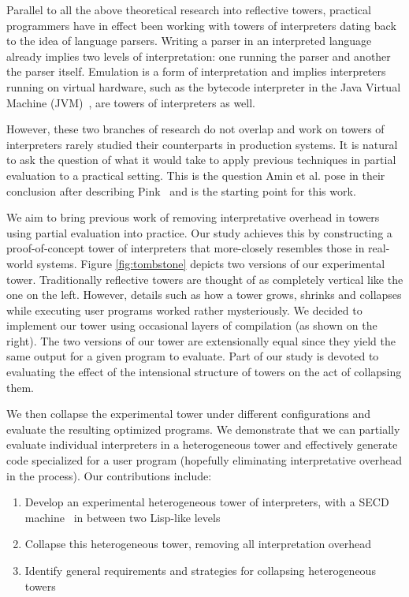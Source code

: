 \documentclass[sigplan,anonymous,review]{acmart}
\theoremstyle{definition}
\begin{document}
Parallel to all the above theoretical research into reflective towers, practical programmers have in effect been working with towers of interpreters dating back to the idea of language parsers. Writing a parser in an interpreted language already implies two levels of interpretation:
one running the parser and another the parser itself. Emulation is a form of interpretation and implies interpreters running on virtual hardware, such as the bytecode interpreter in the Java Virtual Machine (JVM)~\cite{lindholm2014java}, are towers of interpreters as well.

However, these two branches of research do not overlap and work on towers of interpreters rarely studied their counterparts in production systems. It is natural to ask the question of what it would take to apply previous techniques in partial evaluation to a practical setting. This is the question Amin et al. pose in their conclusion after describing Pink~\cite{amin2017collapsing} and is the starting point for this work.

We aim to bring previous work of removing interpretative overhead in towers using partial evaluation into practice. Our study achieves this by constructing a proof-of-concept tower of interpreters that more-closely resembles those in real-world systems. Figure \ref{fig:tombstone} depicts two versions of our experimental tower. Traditionally reflective towers are thought of as completely vertical like the one on the left. However, details such as how a tower grows, shrinks and collapses while executing user programs worked rather mysteriously. We decided to implement our tower using occasional layers of compilation (as shown on the right). The two versions of our tower are extensionally equal since they yield the same output for a given program to evaluate. Part of our study is devoted to evaluating the effect of the intensional structure of towers on the act of collapsing them.

We then collapse the experimental tower under different configurations and evaluate the resulting optimized programs. We demonstrate that we can partially evaluate individual interpreters in a heterogeneous tower and effectively generate code specialized for a user program (hopefully eliminating interpretative overhead in the process).
Our contributions include:
\begin{enumerate}
\item Develop an experimental heterogeneous tower of interpreters, with a SECD machine~\cite{landin1964mechanical,kogge1990architecture} in between two Lisp-like levels
\item Collapse this heterogeneous tower, removing all interpretation overhead
\item Identify general requirements and strategies for collapsing heterogeneous towers
\end{enumerate}
\end{document}
